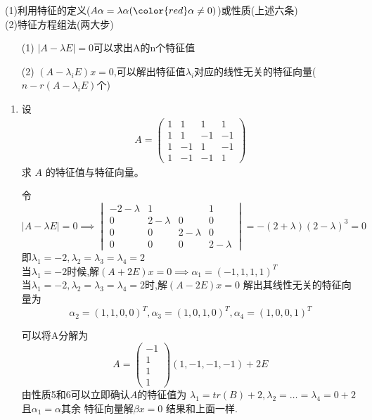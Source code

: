 \documentclass[12pt, a4paper, oneside, UTF8]{ctexbook}
\begin{document}
\begin{remark}[求特征值与特征值向量]
    (1)利用特征的定义($A\alpha = \lambda\alpha({\color{red}\alpha\neq 0})$)或性质(上述六条) \\
    (2)特征方程组法(两大步) 
    \begin{enumerate}
        \item [(1)] $\left|A-\lambda E\right|=0$可以求出A的n个特征值 
        \item [(2)] $(A-\lambda_i E)x=0$,可以解出特征值$\lambda_i$对应的线性无关的特征向量($n-r(A-\lambda_i E)$个)
    \end{enumerate} 
\end{remark}

\begin{enumerate}
    \item 设
    \begin{align*}
    A = \begin{pmatrix}
    1 & 1 & 1 & 1 \\
    1 & 1 & -1 & -1\\
    1 & -1 & 1 & -1 \\
    1 & -1 & -1 & 1
    \end{pmatrix}
    \end{align*}
    求 $A$ 的特征值与特征向量。
    
    \begin{solution}[特征方程法]
    令$\left|A-\lambda E\right| = 0 \implies \begin{vmatrix}
        -2-\lambda & 1 & & 1 \\
        0 & 2-\lambda & 0 & 0 \\
        0 & 0 & 2-\lambda & 0 \\
        0 & 0 & 0 & 2-\lambda
    \end{vmatrix} = -(2+\lambda)(2-\lambda)^3 = 0$ 即$\lambda_1 = -2, \lambda_2=\lambda_3=\lambda_4=2$ \\
    当$\lambda_1=-2$时候,解$(A+2E)x=0\implies \alpha_1=(-1,1,1,1)^T$ \\
    当$\lambda_1 = -2, \lambda_2=\lambda_3=\lambda_4=2$时,解$(A-2E)x=0$ 解出其线性无关的特征向量为 
    $$
    \alpha_2 = (1,1,0,0)^T,\alpha_3 = (1,0,1,0)^T,\alpha_4=(1,0,0,1)^T
    $$
    \end{solution}

    \begin{solution}[分解为秩为1]
    可以将A分解为 
    $$
    A = \begin{pmatrix}
        -1 \\
        1 \\
        1 \\
        1
    \end{pmatrix}(1,-1,-1,-1) + 2E 
    $$
    由性质5和6可以立即确认$A$的特征值为 $\lambda_1=tr(B)+2,\lambda_2=\ldots=\lambda_4=0+2$ 且$\alpha_1=\alpha$其余
    特征向量解$\beta x = 0$ 结果和上面一样. 
    \end{solution}
    

\end{enumerate}
\end{document}

